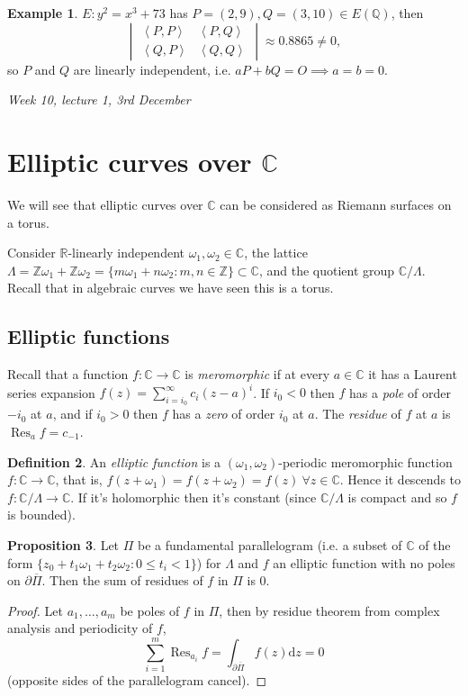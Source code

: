 \documentclass{article}
\newcommand{\Z}{\mathbb{Z}}
\newcommand{\Q}{\mathbb{Q}}
\newcommand{\R}{\mathbb{R}}
\newcommand{\C}{\mathbb{C}}
\newcommand{\Res}{\operatorname{Res}}
\newcommand{\la}{\left\langle}
\newcommand{\ra}{\right\rangle}
\theoremstyle{definition}
\newtheorem{defn}{Definition}[subsection]
\newtheorem{prop}[defn]{Proposition}
\newtheorem{example}[defn]{Example}
\begin{document}
\begin{example}
$E:y^2=x^3+73$ has $P=(2,9),Q=(3,10)\in E(\Q)$, then
\[
\begin{vmatrix}
\la P,P\ra & \la P,Q\ra \\ \la Q,P\ra & \la Q,Q\ra
\end{vmatrix}\approx 0.8865\neq 0,
\]
so $P$ and $Q$ are linearly independent, i.e. $aP+bQ=O\implies a=b=0$.
\end{example}

\begin{flushright}
\textit{Week 10, lecture 1, 3rd December}
\end{flushright}

\section{Elliptic curves over $\C$}
We will see that elliptic curves over $\C$ can be considered as Riemann surfaces on a torus.

Consider $\R$-linearly independent $\omega_1,\omega_2\in\C$, the lattice $\Lambda=\Z\omega_1+\Z\omega_2=\{m\omega_1+n\omega_2:m,n\in\Z\}\subset\C$, and the quotient group $\C/\Lambda$. Recall that in algebraic curves we have seen this is a torus.

\subsection{Elliptic functions}
Recall that a function $f:\C\rightarrow\C$ is \textit{meromorphic} if at every $a\in\C$ it has a Laurent series expansion $f(z)=\sum_{i=i_0}^\infty c_i(z-a)^i$. If $i_0<0$ then $f$ has a \textit{pole} of order $-i_0$ at $a$, and if $i_0>0$ then $f$ has a \textit{zero} of order $i_0$ at $a$. The \textit{residue} of $f$ at $a$ is $\Res_af=c_{-1}$.

\begin{defn}
An \textit{elliptic function} is a $(\omega_1,\omega_2)$-periodic meromorphic function $f:\C\rightarrow\C$, that is, $f(z+\omega_1)=f(z+\omega_2)=f(z) \ \forall z\in\C$. Hence it descends to $f:\C/\Lambda\rightarrow\C$. If it's holomorphic then it's constant (since $\C/\Lambda$ is compact and so $f$ is bounded).
\end{defn}

\begin{prop}
Let $\Pi$ be a fundamental parallelogram (i.e. a subset of $\C$ of the form $\{z_0+t_1\omega_1+t_2\omega_2:0\leq t_i<1\}$) for $\Lambda$ and $f$ an elliptic function with no poles on $\partial\overline\Pi$. Then the sum of residues of $f$ in $\Pi$ is 0.
\end{prop}
\begin{proof}
Let $a_1,\ldots,a_m$ be poles of $f$ in $\Pi$, then by residue theorem from complex analysis and periodicity of $f$,
\[
\sum_{i=1}^m\Res_{a_i}f=\int_{\partial\overline\Pi}f(z)\mathrm dz=0
\]
(opposite sides of the parallelogram cancel).
\end{proof}
\end{document}
